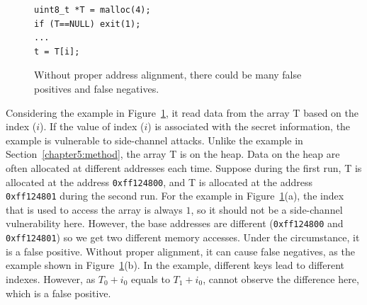 \begin{figure}[h]
  \begin{minipage}{0.45\linewidth}
    \begin{lstlisting}[numbers=none,xleftmargin=.1\textwidth,xrightmargin=.15\textwidth]
uint8_t *T = malloc(4);
if (T==NULL) exit(1);
...
t = T[i];    
\end{lstlisting}
  \end{minipage}
  \hfill
  \begin{minipage}{0.5\linewidth}
  \end{minipage}
  \caption{Without proper address alignment, there could be many false positives and false negatives.}\label{fig:align}
\end{figure}

Considering the example in Figure~\ref{fig:align}, it read data from the array \textsf{T} based on the index ($i$). If the value of index ($i$) is associated with the secret information, the example is vulnerable to side-channel attacks. Unlike the example in Section~\ref{chapter5:method}, the array \textsf{T} is on the heap. Data on the heap are often allocated at different addresses each time. Suppose during the first run, \textsf{T} is allocated at the address \texttt{0xff124800}, and \textsf{T} is allocated at the address \texttt{0xff124801} during the second run. For the example in Figure~\ref{fig:align}(a), the index that is used to access the array is always $1$, so it should not be a side-channel vulnerability here. However, the base addresses are different (\texttt{0xff124800} and \texttt{0xff124801}) so we get two different memory accesses. Under the circumstance, it is a false positive. Without proper alignment, it can cause false negatives, as the example shown in Figure~\ref{fig:align}(b). In the example, different keys lead to different indexes. However, as $T_0 + i_0$ equals to $T_1 + i_0$, \ctool{} cannot observe the difference here, which is a false positive.



